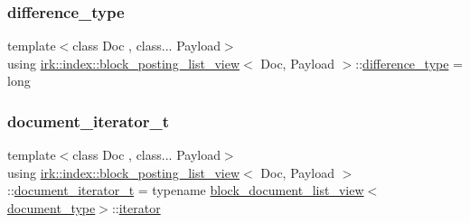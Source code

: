 \subsubsection{\texorpdfstring{difference\+\_\+type}{difference\_type}}
{\footnotesize\ttfamily template$<$class Doc , class... Payload$>$ \\
using \mbox{\hyperlink{classirk_1_1index_1_1block__posting__list__view}{irk\+::index\+::block\+\_\+posting\+\_\+list\+\_\+view}}$<$ Doc, Payload $>$\+::\mbox{\hyperlink{classirk_1_1index_1_1block__posting__list__view_a4298691f17976ec1cec5bc21ab6132ce}{difference\+\_\+type}} =  long}

\mbox{\label{classirk_1_1index_1_1block__posting__list__view_a5b6c3f910a1bd819ff3efa0a619e32a0}} 
\subsubsection{\texorpdfstring{document\+\_\+iterator\+\_\+t}{document\_iterator\_t}}
{\footnotesize\ttfamily template$<$class Doc , class... Payload$>$ \\
using \mbox{\hyperlink{classirk_1_1index_1_1block__posting__list__view}{irk\+::index\+::block\+\_\+posting\+\_\+list\+\_\+view}}$<$ Doc, Payload $>$\+::\mbox{\hyperlink{classirk_1_1index_1_1block__posting__list__view_a5b6c3f910a1bd819ff3efa0a619e32a0}{document\+\_\+iterator\+\_\+t}} =  typename \mbox{\hyperlink{classirk_1_1index_1_1block__document__list__view}{block\+\_\+document\+\_\+list\+\_\+view}}$<$\mbox{\hyperlink{classirk_1_1index_1_1block__posting__list__view_a4a778116d22c9cf347f38da132ca0900}{document\+\_\+type}}$>$\+::\mbox{\hyperlink{classirk_1_1index_1_1block__posting__list__view_1_1iterator}{iterator}}}

\mbox{\label{classirk_1_1index_1_1block__posting__list__view_a4a778116d22c9cf347f38da132ca0900}} 
